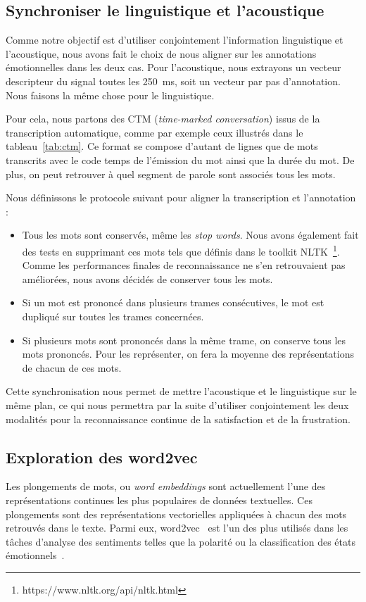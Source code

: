 \subsection{Synchroniser le linguistique et l'acoustique}
Comme notre objectif est d'utiliser conjointement l'information linguistique et l'acoustique, nous avons fait le choix de nous aligner sur les annotations émotionnelles dans les deux cas. Pour l'acoustique, nous extrayons un vecteur descripteur du signal toutes les 250~ms, soit un vecteur par pas d'annotation. Nous faisons la même chose pour le linguistique.

Pour cela, nous partons des CTM (\textit{time-marked conversation}) issus de la transcription automatique, comme par exemple ceux illustrés dans le tableau~\ref{tab:ctm}. Ce format se compose d'autant de lignes que de mots transcrits avec le code temps de l'émission du mot ainsi que la durée du mot. De plus, on peut retrouver à quel segment de parole sont associés tous les mots.



Nous définissons le protocole suivant pour aligner la transcription et l'annotation :
\begin{itemize}
  \item Tous les mots sont conservés, même les \textit{stop words}. Nous avons également fait des tests en supprimant ces mots tels que définis dans le toolkit NLTK~\footnote{https://www.nltk.org/api/nltk.html}. Comme les performances finales de reconnaissance ne s'en retrouvaient pas améliorées, nous avons décidés de conserver tous les mots.
  \item Si un mot est prononcé dans plusieurs trames consécutives, le mot est dupliqué sur toutes les trames concernées.
  \item Si plusieurs mots sont prononcés dans la même trame, on conserve tous les mots prononcés. Pour les représenter, on fera la moyenne des représentations de chacun de ces mots.
\end{itemize}

Cette synchronisation nous permet de mettre l'acoustique et le linguistique sur le même plan, ce qui nous permettra par la suite d'utiliser conjointement les deux modalités pour la reconnaissance continue de la satisfaction et de la frustration.

\subsection{Exploration des word2vec}
Les plongements de mots, ou \textit{word embeddings} sont actuellement l'une des représentations continues les plus populaires de données textuelles. Ces plongements sont des représentations vectorielles appliquées à chacun des mots retrouvés dans le texte.
Parmi eux, word2vec~\cite{word2vec} est l'un des plus utilisés dans les tâches d'analyse des sentiments telles que la polarité ou la classification des états émotionnels~\cite{Dong2018}.

